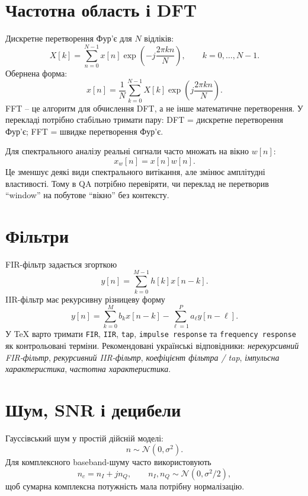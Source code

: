 \section{Частотна область і DFT}
Дискретне перетворення Фур'є для $N$ відліків:
\begin{equation}
 X[k] = \sum_{n=0}^{N-1} x[n] \exp\!\left(-j\frac{2\pi kn}{N}\right), \qquad k=0,\dots,N-1.
\end{equation}
Обернена форма:
\begin{equation}
 x[n] = \frac{1}{N}\sum_{k=0}^{N-1} X[k] \exp\!\left(j\frac{2\pi kn}{N}\right).
\end{equation}
FFT -- це алгоритм для обчислення DFT, а не інше математичне перетворення. У перекладі потрібно стабільно тримати пару: DFT = дискретне перетворення Фур'є; FFT = швидке перетворення Фур'є.

Для спектрального аналізу реальні сигнали часто множать на вікно $w[n]$:
\begin{equation}
 x_w[n] = x[n] w[n].
\end{equation}
Це зменшує деякі види спектрального витікання, але змінює амплітудні властивості. Тому в QA потрібно перевіряти, чи переклад не перетворив ``window'' на побутове ``вікно'' без контексту.

\section{Фільтри}
FIR-фільтр задається згорткою
\begin{equation}
 y[n] = \sum_{k=0}^{M-1} h[k]x[n-k].
\end{equation}
IIR-фільтр має рекурсивну різницеву форму
\begin{equation}
 y[n] = \sum_{k=0}^{M} b_k x[n-k] - \sum_{\ell=1}^{P} a_\ell y[n-\ell].
\end{equation}
У TeX варто тримати \texttt{FIR}, \texttt{IIR}, \texttt{tap}, \texttt{impulse response} та \texttt{frequency response} як контрольовані терміни. Рекомендовані українські відповідники: \emph{нерекурсивний FIR-фільтр}, \emph{рекурсивний IIR-фільтр}, \emph{коефіцієнт фільтра / tap}, \emph{імпульсна характеристика}, \emph{частотна характеристика}.

\section{Шум, SNR і децибели}
Гауссівський шум у простій дійсній моделі:
\begin{equation}
 n \sim \mathcal{N}(0,\sigma^2).
\end{equation}
Для комплексного baseband-шуму часто використовують
\begin{equation}
 n_c = n_I + j n_Q, \qquad n_I,n_Q\sim\mathcal{N}(0,\sigma^2/2),
\end{equation}
щоб сумарна комплексна потужність мала потрібну нормалізацію.

